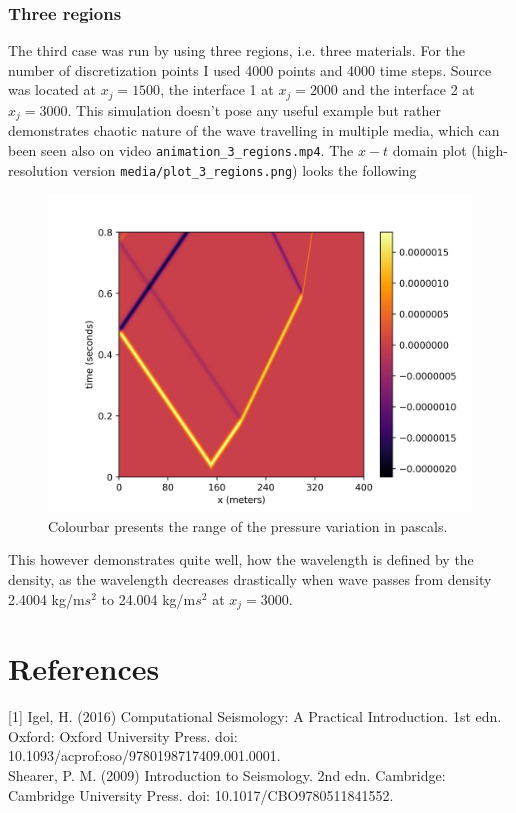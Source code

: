 \documentclass[]{article}
\begin{document}
\subsubsection{Three regions}
The third case was run by using three regions, i.e. three materials. For the number of discretization points I used 4000 points and 4000 time steps. Source was located at $x_j=1500$, the interface 1 at $x_j=2000$ and the interface 2 at $x_j=3000$. This simulation doesn't pose any useful example but rather demonstrates chaotic nature of the wave travelling in multiple media, which can been seen also on video \texttt{animation\_3\_regions.mp4}. The $x-t$ domain plot (high-resolution version \texttt{media/plot\_3\_regions.png}) looks the following 
\begin{figure}[H]
	\centering
	\includegraphics[width=1.0\linewidth]{media/plot_3_regions}
	\caption{Colourbar presents the range of the pressure variation in pascals.}
	\label{fig:plot3regions}
\end{figure}
This however demonstrates quite well, how the wavelength is defined by the density, as the wavelength decreases drastically when wave passes from density 2.4004 kg/m$s^2$ to 24.004 kg/m$s^2$ at $x_j=3000$.

\section{References}
[1]  Igel, H. (2016) Computational Seismology: A Practical Introduction. 1st edn. Oxford: Oxford University Press. doi: 10.1093/acprof:oso/9780198717409.001.0001. \\

\noindent [2] Shearer, P. M. (2009) Introduction to Seismology. 2nd edn. Cambridge: Cambridge University Press. doi: 10.1017/CBO9780511841552.
\end{document}

